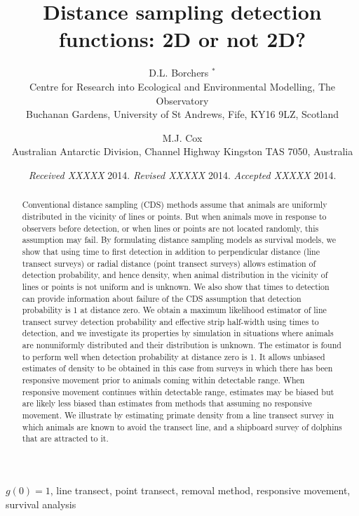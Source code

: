 \documentclass[useAMS,usenatbib,referee]{biom}
\title[2D or not 2D?]{Distance sampling detection functions: 2D or not 2D?}
\author{D.L. Borchers $^{*}$\email{dlb@st-andrews.ac.uk} \\
   Centre for Research into Ecological and Environmental Modelling, The Observatory \\
   Buchanan Gardens, University of St Andrews, Fife, KY16 9LZ, Scotland
   \and 
   M.J. Cox \\
   Australian Antarctic Division, Channel Highway Kingston TAS 7050,  Australia
   }
\begin{document}
\date{{\it Received XXXXX} 2014. {\it Revised XXXXX} 2014.  {\it
Accepted XXXXX} 2014.}

\pagerange{\pageref{firstpage}--\pageref{lastpage}}


\begin{abstract}
Conventional distance sampling (CDS) methods assume that animals are uniformly distributed in the vicinity of lines or points. But when animals move in response to observers before detection, or when lines or points are not located randomly, this assumption may fail. By formulating distance sampling models as survival models, we show that using time to first detection in addition to perpendicular distance (line transect surveys) or radial distance (point transect surveys) allows estimation of detection probability, and hence density, when animal distribution in the vicinity of lines or points is not uniform and is unknown. We also show that times to detection can provide information about failure of the CDS assumption that detection probability is 1 at distance zero. We obtain a maximum likelihood estimator of line transect survey detection probability and effective strip half-width using times to detection, and we investigate its properties by simulation in situations where animals are nonuniformly distributed and their distribution is unknown. The estimator is found to perform well when detection probability at distance zero is 1. It allows unbiased estimates of density to be obtained in this case from surveys in which there has been responsive movement prior to animals coming within detectable range. When responsive movement continues within detectable range, estimates may be biased but are likely less biased than estimates from methods that assuming no responsive movement. We illustrate by estimating primate density from a line transect survey in which animals are known to avoid the transect line, and a shipboard survey of dolphins that are attracted to it.
\end{abstract}

\label{firstpage}

\begin{keywords}
$g(0)=1$, line transect, point transect, removal method, responsive movement, survival analysis
\end{keywords}

\maketitle
\end{document}
